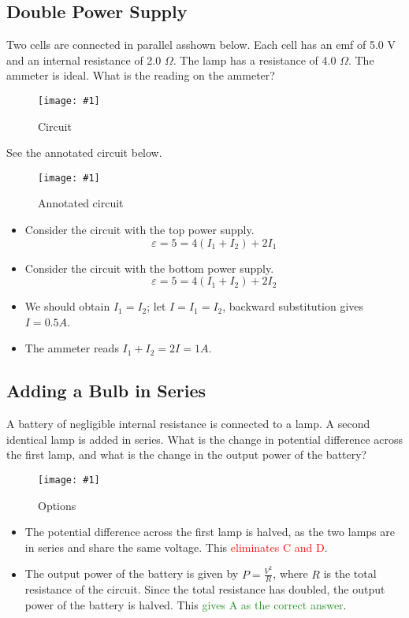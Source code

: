 \documentclass[a4paper,12pt]{article}
\newcommand{\img}[4]{\begin{center}
  \begin{figure}[H]
    \centering
    \texttt{[image: \#1]}
    \caption{#3}
    \label{fig:#4}
  \end{figure}
\end{center}}
\begin{document}
\pagebreak

\subsection{Double Power Supply}

Two cells are connected in parallel asshown below. Each cell has an emf of 5.0 V and an internal resistance of 2.0 $\Omega$. The lamp has a resistance of 4.0 $\Omega$. The ammeter is ideal. What is the reading on the ammeter?

\img{ex/16.png}{0.5}{Circuit}{ex16}

See the annotated circuit below.

\img{ex/17.jpg}{0.5}{Annotated circuit}{ex17}

\begin{itemize}
  \item Consider the circuit with the top power supply. $$\varepsilon = 5 = 4(I_1 + I_2) + 2I_1$$
  \item Consider the circuit with the bottom power supply. $$\varepsilon = 5 = 4(I_1 + I_2) + 2I_2$$
  \item We should obtain $I_1 = I_2$; let $I = I_1 = I_2$, backward substitution gives $I = 0.5A$.
  \item The ammeter reads $I_1 + I_2 = 2I = 1A$.
\end{itemize}

\pagebreak

\subsection{Adding a Bulb in Series}

A battery of negligible internal resistance is connected to a lamp. A second identical lamp is added in series. What is the change in potential difference across the first lamp, and what is the change in the output power of the battery?

\img{ex/18.png}{0.8}{Options}{ex18}

\begin{itemize}
  \item The potential difference across the first lamp is halved, as the two lamps are in series and share the same voltage. This \textcolor{red}{eliminates C and D}.
  \item The output power of the battery is given by $P = \frac{V^2}{R}$, where $R$ is the total resistance of the circuit. Since the total resistance has doubled, the output power of the battery is halved. This \textcolor{ForestGreen}{gives A as the correct answer}.
\end{itemize}
\end{document}
